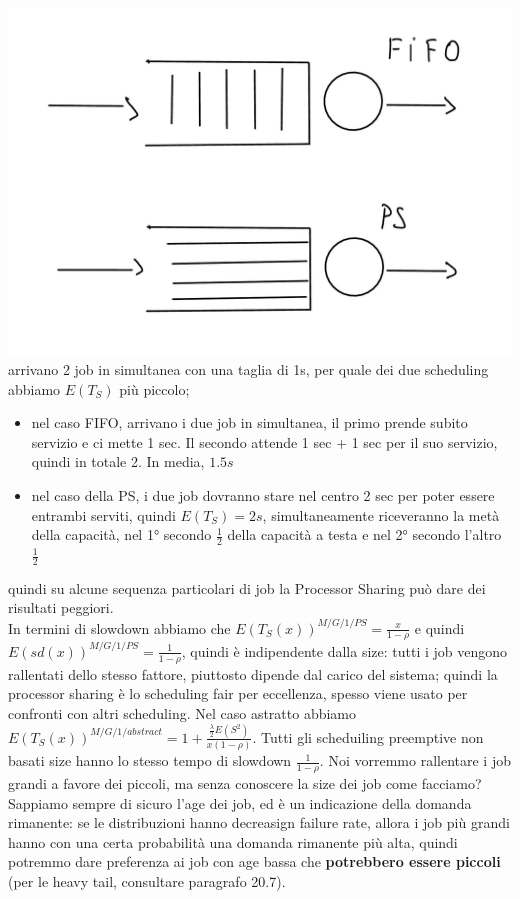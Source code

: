 \documentclass{article}
\begin{document}
\includegraphics[scale=0.3]{images/PMCSN-1603-1.1.jpeg}\\ 
arrivano 2 job in simultanea con una taglia di 1s, per quale dei due scheduling abbiamo $E(T_S)$ più piccolo;
\begin{itemize}
\item nel caso FIFO, arrivano i due job in simultanea, il primo prende subito servizio e ci mette 1 sec. Il secondo attende 1 sec + 1 sec per il suo servizio, quindi in totale 2. In media, $1.5 s$
\item nel caso della PS, i due job dovranno stare nel centro 2 sec per poter essere entrambi serviti, quindi $E(T_S) = 2 s$, simultaneamente riceveranno la metà della capacità, nel 1° secondo $\frac{1}{2}$ della capacità a testa e nel 2° secondo l'altro $\frac{1}{2}$
\end{itemize}
quindi su alcune sequenza particolari di job la Processor Sharing può dare dei risultati peggiori.\\ In termini di slowdown abbiamo che $E(T_S(x))^{M/G/1/PS} = \frac{x}{1 - \rho}$ e quindi $E(sd(x))^{M/G/1/PS} = \frac{1}{1 - \rho}$, quindi è indipendente dalla size: tutti i job vengono rallentati dello stesso fattore, piuttosto dipende dal carico del sistema; quindi la processor sharing è lo scheduling fair per eccellenza, spesso viene usato per confronti con altri scheduling. Nel caso astratto abbiamo $E(T_S(x))^{M/G/1/abstract} = 1 + \frac{\frac{\lambda}{2}E(S^2)}{x(1 - \rho)}$. Tutti gli scheduiling preemptive non basati size hanno lo stesso tempo di slowdown $\frac{1}{1 - \rho}$. Noi vorremmo rallentare i job grandi a favore dei piccoli, ma senza conoscere la size dei job come facciamo? Sappiamo sempre di sicuro l'age dei job, ed è un indicazione della domanda rimanente: se le distribuzioni hanno decreasign failure rate, allora i job più grandi hanno con una certa probabilità una domanda rimanente più alta, quindi potremmo dare preferenza ai job con age bassa che \textbf{potrebbero essere piccoli} (per le heavy tail, consultare paragrafo 20.7).
\end{document}
